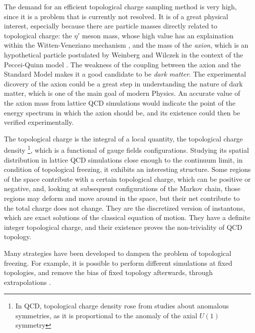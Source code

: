 The demand for an efficient topological charge sampling method is very high, since it is a problem that is currently not resolved.
It is of a great physical interest, especially because there are particle masses directly related to topological charge:
the $\eta'$ meson mass, whose high value has an explaination within the Witten-Veneziano mechanism \cite{witten:1979-1, witten:1979-2, veneziano:1979},
and the mass of the \emph{axion}, which is an hypothetical particle postulated by Weinberg \cite{weinberg:1978} and Wilczek \cite{wilczek:1978}
in the context of the Peccei-Quinn model \cite{peccei-quinn:1977-1, peccei-quinn:1977-2}.
The weakness of the coupling between the axion and the Standard Model makes it a good candidate to be \emph{dark matter}.
The experimental dicovery of the axion could be a great step in understanding the nature of dark matter, which is one of the main goal of modern Physics.
An accurate value of the axion mass from lattice QCD simulations would indicate the point of the energy spectrum in which the axion should be,
and its existence could then be verified experimentally.

The topological charge is the integral of a local quantity, the topological charge density%
\footnote{In QCD, topological charge density rose from studies about anomalous symmetries, as it is proportional to the anomaly of the axial $U(1)$ symmetry},
which is a functional of gauge fields configurations.
Studying its spatial distribution in lattice QCD simulations close enough to the continuum limit, in condition of topological freezing, it exhibits an interesting structure.
Some regions of the space contribute with a certain topological charge, which can be positive or negative, and,
looking at subsequent configurations of the Markov chain,
those regions may deform and move around in the space, but their net contribute to the total charge does not change.
They are the discretized version of instantons, which are exact solutions of the classical equation of motion.
They have a definite integer topological charge, and their existence proves the non-triviality of QCD topology.

Many strategies have been developed to dampen the problem of topological freezing.
For example, it is possible to perform different simulations at fixed topologies,
and remove the bias of fixed topology afterwards, through extrapolations \cite{brower:2003, aoki:2007}.


